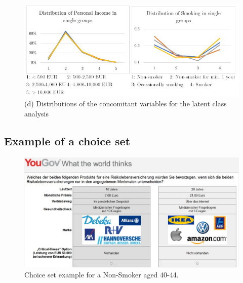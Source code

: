 \documentclass[12pt, abstracton]{article}
\begin{document}
\begin{figure}[H]
	\begin{center}
		\includegraphics[width=\linewidth]{Dist4.jpg}
		\caption*{(d) Distributions of the concomitant variables for the latent class analysis}
		\label{fig:DistSocioVars}
	\end{center}	
\end{figure}
\subsection{Example of a choice set}
	\begin{figure}[H]
		\begin{center}
	\includegraphics[width=\linewidth]{ChoiceSet_Example_NonSmoker4044.jpg}
		\caption{Choice set example for a Non-Smoker aged 40-44.}
		\label{fig:choiceset_ex}
	\end{center}	
	\end{figure}
\cleardoublepage
\end{document}
